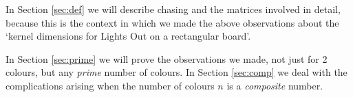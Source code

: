 In Section \ref{sec:def}  we will describe chasing and the matrices involved
in detail, because this is the context in which we made
the above observations about the `kernel dimensions for
Lights Out on a rectangular board'. 

In Section \ref{sec:prime} we will prove the observations we made,
not just for 2 colours, but any {\it prime} number of colours.
In Section \ref{sec:comp} we deal with the complications arising
when the number of colours $n$ is a {\it composite} number.


